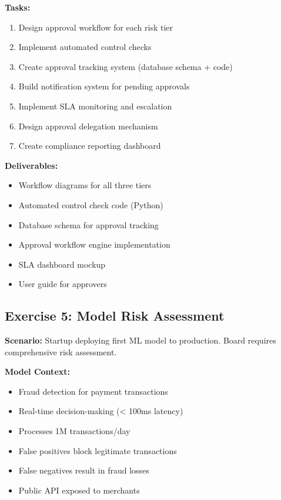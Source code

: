 \textbf{Tasks:}
\begin{enumerate}
    \item Design approval workflow for each risk tier
    \item Implement automated control checks
    \item Create approval tracking system (database schema + code)
    \item Build notification system for pending approvals
    \item Implement SLA monitoring and escalation
    \item Design approval delegation mechanism
    \item Create compliance reporting dashboard
\end{enumerate}

\textbf{Deliverables:}
\begin{itemize}
    \item Workflow diagrams for all three tiers
    \item Automated control check code (Python)
    \item Database schema for approval tracking
    \item Approval workflow engine implementation
    \item SLA dashboard mockup
    \item User guide for approvers
\end{itemize}

\subsection{Exercise 5: Model Risk Assessment}

\textbf{Scenario:} Startup deploying first ML model to production. Board requires comprehensive risk assessment.

\textbf{Model Context:}
\begin{itemize}
    \item Fraud detection for payment transactions
    \item Real-time decision-making (< 100ms latency)
    \item Processes 1M transactions/day
    \item False positives block legitimate transactions
    \item False negatives result in fraud losses
    \item Public API exposed to merchants
\end{itemize}

